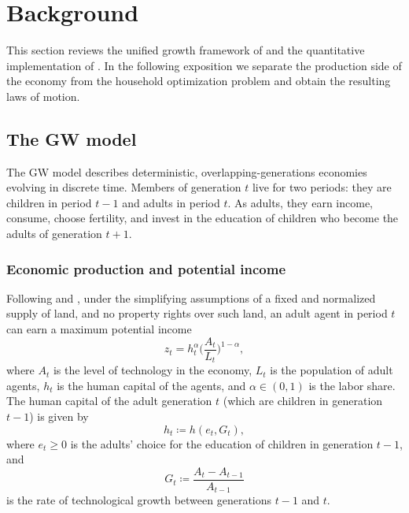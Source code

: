 \documentclass[a4paper,fleqn]{cas-sc}
\begin{document}
\section{Background}\label{sec:background}
This section reviews the unified growth framework of \citet{Galor2000} and the quantitative implementation of \citet{Lagerlof2006}. In the following exposition we separate the production side of the economy from the household optimization problem and obtain the resulting laws of motion.

\subsection{The GW model}\label{subsec:galor_weil_environment}
The GW model describes deterministic, overlapping-generations economies evolving in discrete time. Members of generation $t$ live for two periods: they are children in period $t-1$ and adults in period $t$. As adults, they earn income, consume, choose fertility, and invest in the education of children who become the adults of generation $t+1$.

\subsubsection{Economic production and potential income}\label{subsubsec:production}
Following \citet{Galor2000} and \citet{Galor2011}, under the simplifying assumptions of a fixed and normalized supply of land, and no property rights over such land, an adult agent in period $t$ can earn a maximum potential income 
%
\begin{equation}\label{eq:income_equality} 
    z_t = h_t^{\alpha} \bigg(\frac{A_t}{L_t}\bigg)^{1-\alpha},
\end{equation} 
%
where $A_t$ is the level of technology in the economy, $L_t$ is the population of adult agents, $h_t$ is the human capital of the agents, and $\alpha\in(0,1)$ is the labor share. 
The human capital of the adult generation $t$ (which are children in generation $t-1$) is given by 
%
\begin{equation}\label{eq:human_capital} 
    h_{t} \coloneqq h(e_{t},G_{t}), 
\end{equation} 
%
where $e_{t}\geq 0$ is the adults' choice for the education of children in generation $t-1$, and 
%
\begin{equation}\label{eq:relative_increase_technology} 
    G_{t} \coloneqq \frac{A_{t}-A_{t-1}}{A_{t-1}} 
\end{equation} 
%
is the rate of technological growth between generations $t-1$ and $t$.
\end{document}
